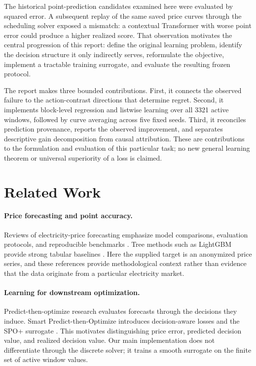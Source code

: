 \documentclass[11pt,a4paper]{article}
\begin{document}
The historical point-prediction candidates examined here were evaluated by squared error. A subsequent replay of the same saved price curves through the scheduling solver exposed a mismatch: a contextual Transformer with worse point error could produce a higher realized score. That observation motivates the central progression of this report: define the original learning problem, identify the decision structure it only indirectly serves, reformulate the objective, implement a tractable training surrogate, and evaluate the resulting frozen protocol.

The report makes three bounded contributions. First, it connects the observed failure to the action-contrast directions that determine regret. Second, it implements block-level regression and listwise learning over all 3321 active windows, followed by curve averaging across five fixed seeds. Third, it reconciles prediction provenance, reports the observed improvement, and separates descriptive gain decomposition from causal attribution. These are contributions to the formulation and evaluation of this particular task; no new general learning theorem or universal superiority of a loss is claimed.

\section{Related Work}
\paragraph{Price forecasting and point accuracy.}
Reviews of electricity-price forecasting emphasize model comparisons, evaluation protocols, and reproducible benchmarks \citep{lago2021}. Tree methods such as LightGBM provide strong tabular baselines \citep{ke2017}. Here the supplied target is an anonymized price series, and these references provide methodological context rather than evidence that the data originate from a particular electricity market.

\paragraph{Learning for downstream optimization.}
Predict-then-optimize research evaluates forecasts through the decisions they induce. Smart Predict-then-Optimize introduces decision-aware losses and the SPO+ surrogate \citep{elmachtoub2022}. This motivates distinguishing price error, predicted decision value, and realized decision value. Our main implementation does not differentiate through the discrete solver; it trains a smooth surrogate on the finite set of active window values.
\end{document}
